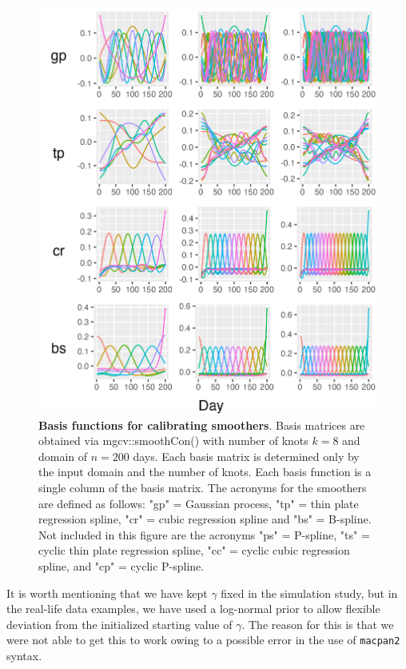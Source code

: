 \documentclass[
11pt, %
oneside, %
english, %
singlespacing, %
]{macthesis} %
\begin{document}
\begin{figure}
\centering
\includegraphics[width=\textwidth]{figure/Simulated/simulation_gp(-2,2,1)_k(20)_k(8,15,20)_bsd2_beta2_plot_basis.png}
\caption[Basis Functions for Smoothing Basis.]{\textbf{Basis functions for calibrating smoothers}. Basis matrices are obtained via mgcv::smoothCon() with number of knots \(k=8\) and domain of \(n=200\) days. Each basis matrix is determined only by the input domain and the number of knots. Each basis function is a single column of the basis matrix. The acronyms for the smoothers are defined as follows: "gp" = Gaussian process, "tp" = thin plate regression spline, "cr" = cubic regression spline and "bs" = B-spline. Not included in this figure are the acronyms "ps" = P-spline, "ts" = cyclic thin plate regression spline, "cc" = cyclic cubic regression spline, and "cp" = cyclic P-spline.}
\label{fig:basis20gp}
\end{figure}

It is worth mentioning that we have kept \(\gamma\) fixed in the simulation study, but in the real-life data examples, we have used a log-normal prior to allow flexible deviation from the initialized starting value of \(\gamma\). The reason for this is that we were not able to get this to work owing to a possible error in the use of \texttt{macpan2} syntax.
\end{document}

